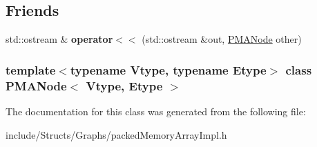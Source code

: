 \subsection*{Friends}
\begin{DoxyCompactItemize}
\item 
\hypertarget{class_p_m_a_node_a0c8aa77f3f69ae92aa62ec9a411d60f7}{
std::ostream \& {\bfseries operator$<$$<$} (std::ostream \&out, \hyperlink{class_p_m_a_node}{PMANode} other)}
\label{class_p_m_a_node_a0c8aa77f3f69ae92aa62ec9a411d60f7}

\end{DoxyCompactItemize}
\subsubsection*{template$<$typename Vtype, typename Etype$>$ class PMANode$<$ Vtype, Etype $>$}



The documentation for this class was generated from the following file:\begin{DoxyCompactItemize}
\item 
include/Structs/Graphs/packedMemoryArrayImpl.h\end{DoxyCompactItemize}
